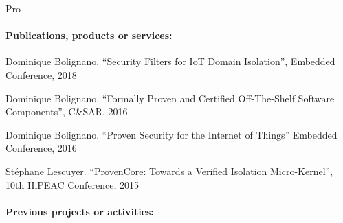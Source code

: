 \begin{sitedescription}{Pro}
\paragraph{Publications, products or services:}


\begin{compactitem}
\item Dominique Bolignano. ``Security Filters for IoT Domain
  Isolation'', Embedded Conference, 2018
\item Dominique Bolignano. ``Formally Proven and Certified
  Off-The-Shelf Software Components'', C\&SAR,
  2016
\item Dominique Bolignano. ``Proven Security for the Internet of
  Things'' Embedded Conference, 2016
\item Stéphane Lescuyer. ``ProvenCore: Towards a Verified Isolation
  Micro-Kernel'', 10th HiPEAC Conference, 2015
\end{compactitem}

\paragraph{Previous projects or activities:}



\end{sitedescription}
